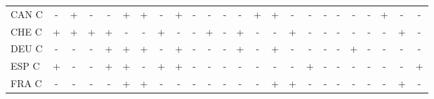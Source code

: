 \documentclass[12pt,bibliography=totoc]{article}
\begin{document}
\begin{appendices}
\begin{table}[H]
\begin{tabular}{l  cccccccc@{\hskip 0.2in}  cccccccc@{\hskip 0.2in}   ccccccc}
CAN C	&\cellcolor{red!25}-	&\cellcolor{green!25}+	&\cellcolor{red!25}-	&\cellcolor{red!25}-	&\cellcolor{green!25}+	&\cellcolor{green!25}+	&\cellcolor{red!25}-	&\cellcolor{green!25}+	&\cellcolor{red!25}-	&\cellcolor{red!25}-	&\cellcolor{red!25}-	&\cellcolor{red!25}-	&\cellcolor{green!25}+	&\cellcolor{green!25}+	&\cellcolor{red!25}-	&\cellcolor{red!25}-	&\cellcolor{red!25}-	&\cellcolor{red!25}-	&\cellcolor{red!25}-	&\cellcolor{red!25}-	&\cellcolor{green!25}+	&\cellcolor{red!25}-	&\cellcolor{red!25}-\\
CHE C	&\cellcolor{green!25}+	&\cellcolor{green!25}+	&\cellcolor{green!25}+	&\cellcolor{green!25}+	&\cellcolor{red!25}-	&\cellcolor{red!25}-	&\cellcolor{green!25}+	&\cellcolor{red!25}-	&\cellcolor{red!25}-	&\cellcolor{green!25}+	&\cellcolor{red!25}-	&\cellcolor{green!25}+	&\cellcolor{red!25}-	&\cellcolor{red!25}-	&\cellcolor{green!25}+	&\cellcolor{red!25}-	&\cellcolor{red!25}-	&\cellcolor{red!25}-	&\cellcolor{red!25}-	&\cellcolor{red!25}-	&\cellcolor{red!25}-	&\cellcolor{green!25}+	&\cellcolor{red!25}-\\
DEU C	&\cellcolor{red!25}-	&\cellcolor{red!25}-	&\cellcolor{red!25}-	&\cellcolor{green!25}+	&\cellcolor{green!25}+	&\cellcolor{green!25}+	&\cellcolor{red!25}-	&\cellcolor{green!25}+	&\cellcolor{red!25}-	&\cellcolor{red!25}-	&\cellcolor{red!25}-	&\cellcolor{green!25}+	&\cellcolor{red!25}-	&\cellcolor{green!25}+	&\cellcolor{red!25}-	&\cellcolor{red!25}-	&\cellcolor{red!25}-	&\cellcolor{red!25}-	&\cellcolor{green!25}+	&\cellcolor{red!25}-	&\cellcolor{red!25}-	&\cellcolor{red!25}-	&\cellcolor{red!25}-\\
ESP C	&\cellcolor{green!25}+	&\cellcolor{red!25}-	&\cellcolor{red!25}-	&\cellcolor{green!25}+	&\cellcolor{green!25}+	&\cellcolor{red!25}-	&\cellcolor{green!25}+	&\cellcolor{green!25}+	&\cellcolor{red!25}-	&\cellcolor{red!25}-	&\cellcolor{red!25}-	&\cellcolor{red!25}-	&\cellcolor{red!25}-	&\cellcolor{red!25}-	&\cellcolor{red!25}-	&\cellcolor{green!25}+	&\cellcolor{red!25}-	&\cellcolor{red!25}-	&\cellcolor{red!25}-	&\cellcolor{red!25}-	&\cellcolor{red!25}-	&\cellcolor{red!25}-	&\cellcolor{green!25}+\\
FRA C	&\cellcolor{red!25}-	&\cellcolor{red!25}-	&\cellcolor{red!25}-	&\cellcolor{red!25}-	&\cellcolor{green!25}+	&\cellcolor{green!25}+	&\cellcolor{red!25}-	&\cellcolor{red!25}-	&\cellcolor{red!25}-	&\cellcolor{red!25}-	&\cellcolor{red!25}-	&\cellcolor{red!25}-	&\cellcolor{red!25}-	&\cellcolor{green!25}+	&\cellcolor{green!25}+	&\cellcolor{red!25}-	&\cellcolor{red!25}-	&\cellcolor{red!25}-	&\cellcolor{red!25}-	&\cellcolor{red!25}-	&\cellcolor{red!25}-	&\cellcolor{green!25}+	&\cellcolor{red!25}-\\

\end{tabular}
\end{table}
\end{appendices}
\end{document}
